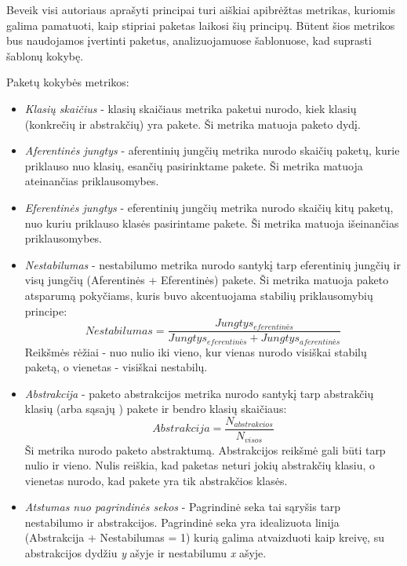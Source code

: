 Beveik visi autoriaus aprašyti principai turi aiškiai apibrėžtas metrikas, kuriomis galima pamatuoti, kaip stipriai paketas laikosi šių principų.
Būtent šios metrikos bus naudojamos įvertinti paketus, analizuojamuose šablonuose, kad suprasti šablonų kokybę.

Paketų kokybės metrikos:
\begin{itemize}
    \item \textit{Klasių skaičius} - klasių skaičiaus metrika paketui nurodo, kiek klasių (konkrečių ir abstrakčių) yra pakete.
    Ši metrika matuoja paketo dydį.
    \item \textit{Aferentinės jungtys } - aferentinių jungčių metrika nurodo
    skaičių paketų, kurie priklauso nuo klasių, esančių pasirinktame pakete.
    Ši metrika matuoja ateinančias priklausomybes.
    \item \textit{Eferentinės jungtys } - eferentinių jungčių metrika nurodo skaičių kitų paketų,
    nuo kuriu priklauso klasės pasirintame pakete.
    Ši metrika matuoja išeinančias priklausomybes.
    \item \textit{Nestabilumas} - nestabilumo metrika nurodo santykį tarp eferentinių jungčių ir
    visų jungčių (Aferentinės + Eferentinės) pakete.
    Ši metrika matuoja paketo atsparumą pokyčiams, kuris buvo akcentuojama stabilių priklausomybių principe:
    \begin{equation}
        Nestabilumas=\frac{Jungtys_{eferentinės}}{Jungtys_{eferentinės} + Jungtys_{aferentinės}}
    \end{equation}
    Reikšmės rėžiai - nuo nulio iki vieno, kur vienas nurodo visiškai stabilų paketą, o vienetas - visiškai nestabilų.
    \item \textit{Abstrakcija} - paketo abstrakcijos metrika nurodo santykį tarp abstrakčių klasių (arba sąsajų ) pakete ir bendro klasių skaičiaus:
    \begin{equation}
        Abstrakcija=\frac{N_{abstrakcios}}{N_{visos}}
    \end{equation}
    Ši metrika nurodo paketo abstraktumą.
    Abstrakcijos reikšmė gali būti tarp nulio ir vieno.
    Nulis reiškia, kad paketas neturi jokių abstrakčių klasiu, o vienetas nurodo, kad pakete yra tik abstrakčios klasės.
    \item \textit{Atstumas nuo pagrindinės sekos} -
    Pagrindinė seka tai sąryšis tarp nestabilumo ir abstrakcijos.
    Pagrindinė seka yra idealizuota linija (Abstrakcija + Nestabilumas = 1)  kurią galima atvaizduoti kaip kreivę, su abstrakcijos dydžiu \textit{y} ašyje ir nestabilumu \textit{x} ašyje.

\end{itemize}
